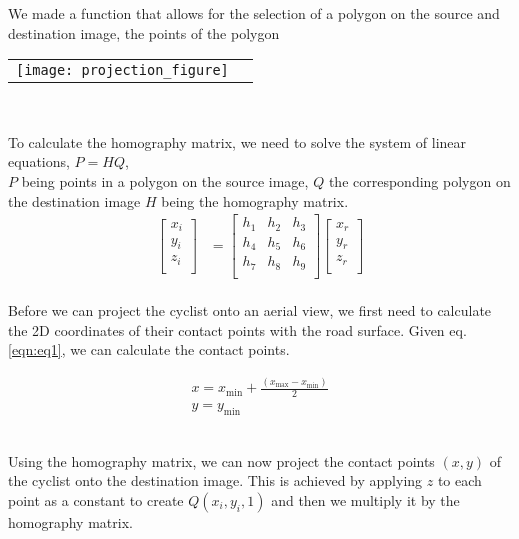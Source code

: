 We made a function that allows for the selection of a polygon on the source and destination image, the points
of the polygon

\noindent
\begin{tabular}{@{}cc}
\texttt{[image: projection\_figure]} 
\end{tabular}
\label{projection_figure}
\

To calculate the homography matrix, we need to solve the system of linear equations, $P = HQ$,
\ \\
$P$ being points in a polygon on the source image, $Q$ the corresponding polygon on the destination image $H$ being the homography matrix.
\begin{align}
\label{eq:3}
  \begin{bmatrix}
    x_{i} \\
    y_{i} \\
    z_{i} \\
  \end{bmatrix}
  &= \begin{bmatrix}
      h_1 & h_2 & h_3 \\
      h_4 & h_5 & h_6 \\
      h_7 & h_8 & h_9 \\
  \end{bmatrix}
  \begin{bmatrix}
    x_{r} \\
    y_{r} \\
    z_{r} \\ 
  \end{bmatrix}
\end{align}
\ \\

Before we can project the cyclist onto an aerial view, we first need to calculate the 2D coordinates of their contact points with the road surface.
Given eq. \ref{eqn:eq1}, we can calculate the contact points.

\begin{equation}
\label{eqn:eq1}
\begin{array}{l}
x = x_\mathrm{min} + \frac{(x_\mathrm{max} - x_\mathrm{min})}{2} \\
y = y_\mathrm{min}
\end{array}
\end{equation}
\

Using the homography matrix, we can now project the contact points $(x, y)$ of the cyclist onto the destination
image. This is achieved by applying $z$ to each point as a constant to create $Q(x_i, y_i, 1)$ and then we multiply it by the homography matrix. 

